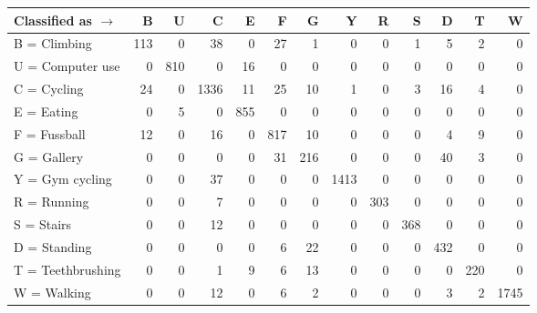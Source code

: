 \begin{tabular}{lrrrrrrrrrrrr}
\toprule
Classified as $\rightarrow$ &    B &    U &     C &    E &    F &    G &     Y &    R &    S &    D &    T &     W \\
\midrule
B = Climbing      &  113 &    0 &    38 &    0 &   27 &    1 &     0 &    0 &    1 &    5 &    2 &     0 \\
U = Computer use  &    0 &  810 &     0 &   16 &    0 &    0 &     0 &    0 &    0 &    0 &    0 &     0 \\
C = Cycling       &   24 &    0 &  1336 &   11 &   25 &   10 &     1 &    0 &    3 &   16 &    4 &     0 \\
E = Eating        &    0 &    5 &     0 &  855 &    0 &    0 &     0 &    0 &    0 &    0 &    0 &     0 \\
F = Fussball      &   12 &    0 &    16 &    0 &  817 &   10 &     0 &    0 &    0 &    4 &    9 &     0 \\
G = Gallery       &    0 &    0 &     0 &    0 &   31 &  216 &     0 &    0 &    0 &   40 &    3 &     0 \\
Y = Gym cycling   &    0 &    0 &    37 &    0 &    0 &    0 &  1413 &    0 &    0 &    0 &    0 &     0 \\
R = Running       &    0 &    0 &     7 &    0 &    0 &    0 &     0 &  303 &    0 &    0 &    0 &     0 \\
S = Stairs        &    0 &    0 &    12 &    0 &    0 &    0 &     0 &    0 &  368 &    0 &    0 &     0 \\
D = Standing      &    0 &    0 &     0 &    0 &    6 &   22 &     0 &    0 &    0 &  432 &    0 &     0 \\
T = Teethbrushing &    0 &    0 &     1 &    9 &    6 &   13 &     0 &    0 &    0 &    0 &  220 &     0 \\
W = Walking       &    0 &    0 &    12 &    0 &    6 &    2 &     0 &    0 &    0 &    3 &    2 &  1745 \\
\bottomrule
\end{tabular}
